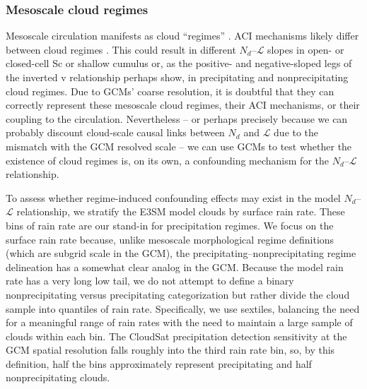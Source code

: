 \documentclass[acp, manuscript]{copernicus}\usepackage[]{graphicx}\usepackage[]{xcolor}
\newcommand\nd{\ensuremath{N_d}}
\newcommand\lwp{\ensuremath{\mathcal L}}
\begin{document}
\subsubsection{Mesoscale cloud regimes}

Mesoscale circulation manifests as cloud ``regimes'' \citep[e.g.,][]
{Rossow2005, Gryspeerdt2012, Muhlbauer2014, unglaub2020}.  ACI mechanisms likely differ
between cloud regimes \citep[e.g.,][]{Muelmenstaedt2018,Possner2020,dipu2022}.  This could result in different
\nd--\lwp{} slopes in open- or closed-cell Sc or shallow cumulus or, as the
positive- and negative-sloped legs of the inverted v relationship perhaps
show, in precipitating and nonprecipitating cloud regimes.  Due to GCMs' coarse
resolution, it is doubtful that
they can correctly represent these mesoscale cloud regimes, their ACI
mechanisms, or their coupling to the circulation.  Nevertheless -- or perhaps
precisely because we can probably discount cloud-scale causal
links between \nd{} and \lwp{} due to the mismatch with the GCM resolved scale -- we
can use GCMs to test whether the existence of cloud regimes is, on its own, a
confounding mechanism for the \nd--\lwp{} relationship.

To assess whether regime-induced confounding effects may exist in the model
\nd--\lwp{} relationship, 
we stratify the E3SM model
clouds by surface rain rate.  These bins of rain rate are our stand-in for
precipitation regimes.  We focus on the surface rain rate because, unlike
mesoscale morphological regime definitions (which are subgrid scale in the GCM),
the precipitating--nonprecipitating regime delineation has a somewhat clear
analog in the GCM.  Because the model rain rate has a very long low tail, we do not attempt to define a binary nonprecipitating versus precipitating
categorization but rather divide the cloud sample into quantiles of rain rate.
Specifically, we use sextiles, balancing the need for a meaningful range of rain rates with the need to 
maintain a large sample of clouds within each bin.  The CloudSat
precipitation detection sensitivity at the GCM spatial resolution
\citep[$\approx 0.01~\text{mm}~\text{d}^{-1}$;][]{Stephens2010} falls roughly into the third rain rate bin, so, by
this definition, half the
bins approximately represent precipitating and half nonprecipitating clouds.  
\end{document}
